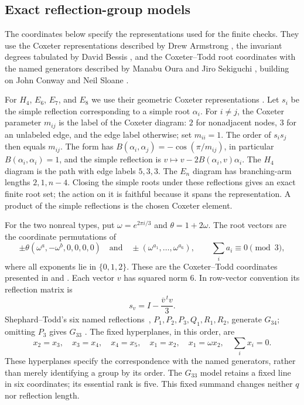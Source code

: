 \documentclass[11pt]{article}
\theoremstyle{definition}
\begin{document}
\begin{appendices}
\section{Exact reflection-group models}\label{app:models}
The coordinates below specify the representations used for the finite
checks. They use the Coxeter representations described by Drew
Armstrong \cite{Armstrong}, the invariant degrees tabulated by David
Bessis \cite[Table~2]{Bessis}, and the Coxeter--Todd root coordinates
\cite{CT1953} with the named generators described by Manabu Oura and
Jiro Sekiguchi \cite{OS}, building on John Conway and Neil Sloane
\cite{CS}.

For $H_4$, $E_6$, $E_7$, and $E_8$ we use their geometric Coxeter
representations \cite[\S2.1 and Figure~2.1]{Armstrong}. Let $s_i$
be the simple reflection corresponding to a simple root $\alpha_i$.
For $i\ne j$, the Coxeter parameter $m_{ij}$ is the label of the
Coxeter diagram: $2$ for nonadjacent nodes, $3$ for an unlabeled edge,
and the edge label otherwise; set $m_{ii}=1$. The order of $s_is_j$
then equals $m_{ij}$. The form has
$B(\alpha_i,\alpha_j)=-\cos(\pi/m_{ij})$, in particular
$B(\alpha_i,\alpha_i)=1$, and the simple reflection
is $v\mapsto v-2B(\alpha_i,v)\alpha_i$. The $H_4$ diagram is the
path with edge labels $5,3,3$. The $E_n$ diagram has branching-arm
lengths $2,1,n-4$. Closing the simple roots under these reflections
gives an exact finite root set; the action on it is faithful because
it spans the representation. A product of the simple reflections is
the chosen Coxeter element.

For the two nonreal types, put $\omega=e^{2\pi i/3}$ and
$\theta=1+2\omega$. The root vectors are the coordinate permutations
of
\[
 \pm\theta(\omega^a,-\omega^b,0,0,0,0)
 \quad\text{and}\quad
 \pm(\omega^{a_1},\ldots,\omega^{a_6}),
 \qquad \sum_i a_i\equiv0\pmod3,
\]
where all exponents lie in $\{0,1,2\}$. These are the
Coxeter--Todd coordinates presented in \cite[\S2]{OS} and
\cite[\S2.3, Table~2]{CS}. Each vector $v$ has squared norm $6$.
In row-vector convention its reflection matrix is
\[
                  s_v=I-\frac{\overline v^{\,t}v}{3}.
\]
Shephard--Todd's six named reflections~\cite[p.~298]{ST},
$P_1,P_2,P_3,Q_1,R_1,R_2$, generate
$G_{34}$; omitting $P_3$ gives $G_{33}$
\cite[\S2 and \S6.1]{OS}. The fixed hyperplanes, in this order, are
\[
 x_2=x_3,\quad x_3=x_4,\quad x_4=x_5,\quad
 x_1=x_2,\quad x_1=\omega x_2,\quad \sum_i x_i=0.
\]
These hyperplanes specify the correspondence with the named generators,
rather than merely identifying a group by its order. The $G_{33}$
model retains a fixed line in six coordinates; its essential rank is
five. This fixed summand changes neither $q$ nor reflection length.


\end{appendices}
\end{document}
